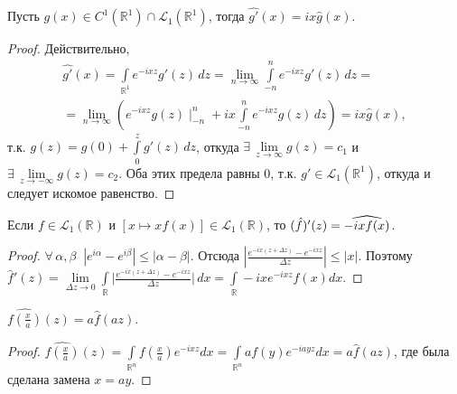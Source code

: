 \documentclass[10pt]{article}
\newcommand*{\p}[1]{#1\nobreak\discretionary{}{\hbox{$\mathsurround=0pt #1$}}{}}
\begin{document}
\begin{theorem}
Пусть $g(x)\in C^1(\mathbb{R}^1)\cap\mathcal{L}_1(\mathbb{R}^1)$,
тогда $\widehat{g'}(x)=ix\hat{g}(x)$.
\end{theorem}

\begin{proof}
Действительно,
\begin{multline*}
\widehat{g'}(x)=\int\limits_{\mathbb{R}^1}\!e^{-ixz}g'(z)\,dz=\lim\limits_{n\to\infty}
\int\limits_{-n}^n\!e^{-ixz}g'(z)\,dz=\\=\lim\limits_{n\to\infty}\left(e^{-ixz}g(z)\mid_{-n}^n
+ix\int\limits_{-n}^n\!e^{-ixz}g(z)\,dz\right)=ix\hat{g}(x),
\end{multline*}
т.к. $g(z)=g(0)+\int\limits_{0}^z\!g'(z)\,dz$, откуда
$\exists\,\lim\limits_{z\to\infty}g(z)=c_1$ и
$\exists\,\lim\limits_{z\to-\infty}g(z)=c_2$. Оба этих предела равны
0, т.к. $g'\in\mathcal{L}_1(\mathbb{R}^1)$, откуда и следует искомое
равенство.
\end{proof}




\begin{theorem}
Если $f\in \mathcal{L}_1(\mathbb{R})$ и $[x\mapsto xf(x)]\in
\mathcal{L}_1(\mathbb{R})$, то $(\hat f)'(z)\p=\widehat{-ixf(x)}$.
\end{theorem}

\begin{proof}
$\forall\, \alpha, \beta\;\; |e^{i\alpha}-e^{i\beta}|\leqslant
|\alpha-\beta|$. Отсюда $|\frac{e^{-ix(z+\Delta z)}-e^{-ixz}}{\Delta
z}|\leqslant |x|$. Поэтому $\hat f'(z)=\lim\limits_{\Delta z\to
0}\int\limits_{\mathbb{R}} \Big|\frac{e^{-ix(z+\Delta
z)}-e^{-ixz}}{\Delta
z}\Big|\,dx=\int\limits_{\mathbb{R}}-ixe^{-ixz}f(x)dx$.
\end{proof}


\begin{theorem}
$\widehat{f(\frac{x}{a})}(z)=a\hat f(az)$.
\end{theorem}

\begin{proof}
$\widehat{f(\frac{x}{a})}(z)=\int\limits_{\mathbb{R}^n}f(\frac{x}{a})e^{-ixz}dx=
\int\limits_{\mathbb{R}^n}af(y)e^{-iayz}dx=a\hat f(az)$, где была
сделана замена $x=ay$.
\end{proof}
\end{document}
